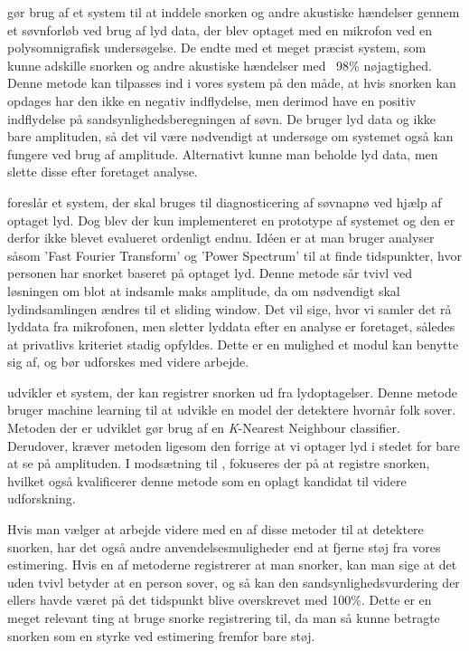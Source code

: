 \citet{Dafna2013} gør brug af et system til at inddele snorken og andre akustiske hændelser gennem et søvnforløb ved brug af lyd data, der blev optaget med en mikrofon ved en polysomnigrafisk undersøgelse. 
De endte med et meget præcist system, som kunne adskille snorken og andre akustiske hændelser med ~98\% nøjagtighed.
Denne metode kan tilpasses ind i vores system på den måde, at hvis snorken kan opdages har den ikke en negativ indflydelse, men derimod have en positiv indflydelse på sandsynlighedsberegningen af søvn. 
De bruger lyd data og ikke bare amplituden, så det vil være nødvendigt at undersøge om systemet også kan fungere ved brug af amplitude.
Alternativt kunne man beholde lyd data, men slette disse efter foretaget analyse.

\citet{Calabrese20111101} foreslår et system, der skal bruges til diagnosticering af søvnapnø ved hjælp af optaget lyd.
Dog blev der kun implementeret en prototype af systemet og den er derfor ikke blevet evalueret ordenligt endnu. 
Idéen er at man bruger analyser såsom 'Fast Fourier Transform' og 'Power Spectrum' til at finde tidspunkter, hvor personen har snorket baseret på optaget lyd. 
Denne metode sår tvivl ved løsningen om blot at indsamle maks amplitude, da om nødvendigt skal lydindsamlingen ændres til et sliding window.
Det vil sige, hvor vi samler det rå lyddata fra mikrofonen, men sletter lyddata efter en analyse er foretaget, således at privatlivs kriteriet stadig opfyldes.
Dette er en mulighed et modul kan benytte sig af, og bør udforskes med videre arbejde.

\citet{7051338} udvikler et system, der kan registrer snorken ud fra lydoptagelser.
Denne metode bruger machine learning til at udvikle en model der detektere hvornår folk sover.
Metoden der er udviklet gør brug af en \textit{K}-Nearest Neighbour classifier.
Derudover, kræver metoden ligesom den forrige at vi optager lyd i stedet for bare at se på amplituden.
I modsætning til \citet{Calabrese20111101}, fokuseres der på at registre snorken, hvilket også kvalificerer denne metode som en oplagt kandidat til videre udforskning.

Hvis man vælger at arbejde videre med en af disse metoder til at detektere snorken, har det også andre anvendelsesmuligheder end at fjerne støj fra vores estimering.
Hvis en af metoderne registrerer at man snorker, kan man sige at det uden tvivl betyder at en person sover, og så kan den sandsynlighedsvurdering der ellers havde været på det tidspunkt blive overskrevet med 100\%.
Dette er en meget relevant ting at bruge snorke registrering til, da man så kunne betragte snorken som en styrke ved estimering fremfor bare støj.